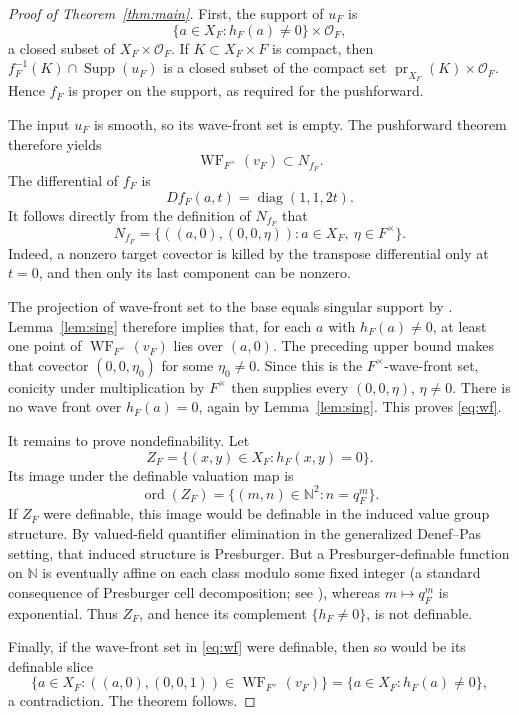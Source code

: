 \documentclass[11pt]{article}
\newcommand{\cO}{\mathcal O}
\newcommand{\WF}{\operatorname{WF}}
\begin{document}
\begin{proof}[Proof of Theorem~\ref{thm:main}]
First, the support of \(u_F\) is
\[
  \{a\in X_F:h_F(a)\ne0\}\times\cO_F,
\]
a closed subset of \(X_F\times\cO_F\).  If \(K\subset X_F\times F\) is
compact, then
\(f_F^{-1}(K)\cap\operatorname{Supp}(u_F)\) is a closed subset of the compact
set \(\operatorname{pr}_{X_F}(K)\times\cO_F\).  Hence \(f_F\) is proper on
the support, as required for the pushforward.

The input \(u_F\) is smooth, so its wave-front set is empty.  The pushforward
theorem \cite[Theorem 2.9.6]{CHLR} therefore yields
\[
  \WF_{F^\times}(v_F)\subset N_{f_F}.
\]
The differential of \(f_F\) is
\[
 Df_F(a,t)=\operatorname{diag}(1,1,2t).
\]
It follows directly from the definition of \(N_{f_F}\) that
\[
 N_{f_F}
 =\{((a,0),(0,0,\eta)):a\in X_F,\ \eta\in F^\times\}.
\]
Indeed, a nonzero target covector is killed by the transpose differential
only at \(t=0\), and then only its last component can be nonzero.

The projection of wave-front set to the base equals singular support by
\cite[Proposition 2.8.3]{CHLR}.  Lemma~\ref{lem:sing} therefore implies that,
for each \(a\) with \(h_F(a)\ne0\), at least one point of
\(\WF_{F^\times}(v_F)\) lies over \((a,0)\).  The preceding upper bound makes
that covector \((0,0,\eta_0)\) for some \(\eta_0\ne0\).  Since this is the
\(F^\times\)-wave-front set, conicity under multiplication by \(F^\times\)
then supplies every \((0,0,\eta)\), \(\eta\ne0\).  There is no wave front over
\(h_F(a)=0\), again by Lemma~\ref{lem:sing}.  This proves
\eqref{eq:wf}.

It remains to prove nondefinability.  Let
\[
 Z_F=\{(x,y)\in X_F:h_F(x,y)=0\}.
\]
Its image under the definable valuation map is
\[
 \operatorname{ord}(Z_F)
 =\{(m,n)\in\mathbb N^2:n=q_F^m\}.
\]
If \(Z_F\) were definable, this image would be definable in the induced value
group structure.  By valued-field quantifier elimination in the generalized
Denef--Pas setting, that induced structure is Presburger.  But a
Presburger-definable function on \(\mathbb N\) is eventually affine on each
class modulo some fixed integer (a standard consequence of Presburger cell
decomposition; see \cite{CluckersPresburger}), whereas \(m\mapsto q_F^m\) is
exponential.  Thus \(Z_F\), and hence its complement \(\{h_F\ne0\}\), is not
definable.

Finally, if the wave-front set in \eqref{eq:wf} were definable, then so would
be its definable slice
\[
 \{a\in X_F:((a,0),(0,0,1))\in\WF_{F^\times}(v_F)\}
 =\{a\in X_F:h_F(a)\ne0\},
\]
a contradiction.  The theorem follows.
\end{proof}
\end{document}

